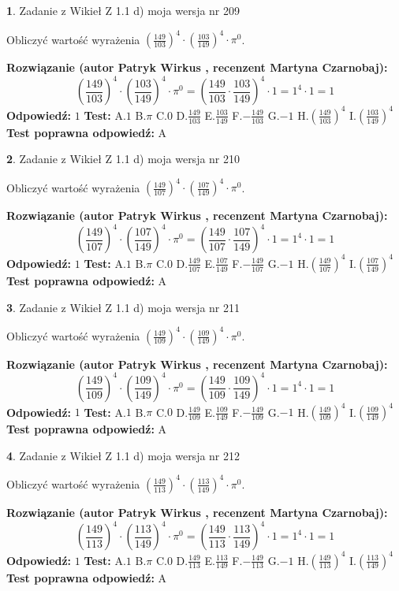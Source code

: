 \documentclass[12pt, a4paper]{article}
\theoremstyle{definition} %
\newtheorem{zad}{}
\newcommand{\zadStart}[1]{\begin{zad}#1\newline}
\newcommand{\zadStop}{\end{zad}}
\newcommand{\rozwStart}[2]{\noindent \textbf{Rozwiązanie (autor #1 , recenzent #2): }\newline}
\newcommand{\rozwStop}{\newline}
\newcommand{\odpStart}{\noindent \textbf{Odpowiedź:}\newline}
\newcommand{\odpStop}{\newline}
\newcommand{\testStart}{\noindent \textbf{Test:}\newline}
\newcommand{\testStop}{\newline}
\newcommand{\kluczStart}{\noindent \textbf{Test poprawna odpowiedź:}\newline}
\newcommand{\kluczStop}{\newline}
\begin{document}
\zadStart{Zadanie z Wikieł Z 1.1 d) moja wersja nr 209}

Obliczyć wartość wyrażenia $(\frac{149}{103})^{4} \cdot (\frac{103}{149})^{4} \cdot \pi^{0}$.
\zadStop
\rozwStart{Patryk Wirkus}{Martyna Czarnobaj}
$$(\frac{149}{103})^{4} \cdot (\frac{103}{149})^{4} \cdot \pi^{0} = (\frac{149}{103} \cdot \frac{103}{149})^{4} \cdot 1 = 1^{4} \cdot 1 = 1$$
\rozwStop
\odpStart
$1$
\odpStop
\testStart
A.$1$ B.$\pi$ C.$0$ D.$\frac{149}{103}$ E.$\frac{103}{149}$
F.$-\frac{149}{103}$ G.$-1$
H.$(\frac{149}{103})^{4}$
I.$(\frac{103}{149})^{4}$
\testStop
\kluczStart
A
\kluczStop



\zadStart{Zadanie z Wikieł Z 1.1 d) moja wersja nr 210}

Obliczyć wartość wyrażenia $(\frac{149}{107})^{4} \cdot (\frac{107}{149})^{4} \cdot \pi^{0}$.
\zadStop
\rozwStart{Patryk Wirkus}{Martyna Czarnobaj}
$$(\frac{149}{107})^{4} \cdot (\frac{107}{149})^{4} \cdot \pi^{0} = (\frac{149}{107} \cdot \frac{107}{149})^{4} \cdot 1 = 1^{4} \cdot 1 = 1$$
\rozwStop
\odpStart
$1$
\odpStop
\testStart
A.$1$ B.$\pi$ C.$0$ D.$\frac{149}{107}$ E.$\frac{107}{149}$
F.$-\frac{149}{107}$ G.$-1$
H.$(\frac{149}{107})^{4}$
I.$(\frac{107}{149})^{4}$
\testStop
\kluczStart
A
\kluczStop



\zadStart{Zadanie z Wikieł Z 1.1 d) moja wersja nr 211}

Obliczyć wartość wyrażenia $(\frac{149}{109})^{4} \cdot (\frac{109}{149})^{4} \cdot \pi^{0}$.
\zadStop
\rozwStart{Patryk Wirkus}{Martyna Czarnobaj}
$$(\frac{149}{109})^{4} \cdot (\frac{109}{149})^{4} \cdot \pi^{0} = (\frac{149}{109} \cdot \frac{109}{149})^{4} \cdot 1 = 1^{4} \cdot 1 = 1$$
\rozwStop
\odpStart
$1$
\odpStop
\testStart
A.$1$ B.$\pi$ C.$0$ D.$\frac{149}{109}$ E.$\frac{109}{149}$
F.$-\frac{149}{109}$ G.$-1$
H.$(\frac{149}{109})^{4}$
I.$(\frac{109}{149})^{4}$
\testStop
\kluczStart
A
\kluczStop



\zadStart{Zadanie z Wikieł Z 1.1 d) moja wersja nr 212}

Obliczyć wartość wyrażenia $(\frac{149}{113})^{4} \cdot (\frac{113}{149})^{4} \cdot \pi^{0}$.
\zadStop
\rozwStart{Patryk Wirkus}{Martyna Czarnobaj}
$$(\frac{149}{113})^{4} \cdot (\frac{113}{149})^{4} \cdot \pi^{0} = (\frac{149}{113} \cdot \frac{113}{149})^{4} \cdot 1 = 1^{4} \cdot 1 = 1$$
\rozwStop
\odpStart
$1$
\odpStop
\testStart
A.$1$ B.$\pi$ C.$0$ D.$\frac{149}{113}$ E.$\frac{113}{149}$
F.$-\frac{149}{113}$ G.$-1$
H.$(\frac{149}{113})^{4}$
I.$(\frac{113}{149})^{4}$
\testStop
\kluczStart
A
\kluczStop
\end{document}
